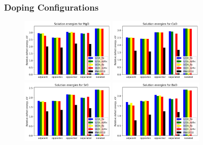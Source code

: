 \documentclass{beamer}
\begin{document}
\begin{frame}
\frametitle{Doping Configurations}

\begin{figure}
\includegraphics[width=0.4\textwidth]{mg_absolute.jpg}
\includegraphics[width=0.4\textwidth]{ca_absolute.jpg}
\includegraphics[width=0.4\textwidth]{sr_absolute.jpg}
\includegraphics[width=0.4\textwidth]{ba_absolute.jpg}
\end{figure}

\end{frame}
\end{document}
